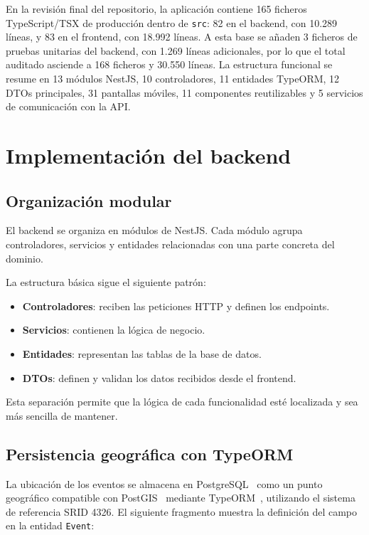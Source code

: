 En la revisión final del repositorio, la aplicación contiene 165 ficheros TypeScript/TSX de producción dentro de \texttt{src}: 82 en el backend, con 10.289 líneas, y 83 en el frontend, con 18.992 líneas. A esta base se añaden 3 ficheros de pruebas unitarias del backend, con 1.269 líneas adicionales, por lo que el total auditado asciende a 168 ficheros y 30.550 líneas. La estructura funcional se resume en 13 módulos NestJS, 10 controladores, 11 entidades TypeORM, 12 DTOs principales, 31 pantallas móviles, 11 componentes reutilizables y 5 servicios de comunicación con la API.

\section{Implementación del backend}

\subsection{Organización modular}

El backend se organiza en módulos de NestJS. Cada módulo agrupa controladores, servicios y entidades relacionadas con una parte concreta del dominio.

La estructura básica sigue el siguiente patrón:

\begin{itemize}
    \item \textbf{Controladores}: reciben las peticiones HTTP y definen los endpoints.
    \item \textbf{Servicios}: contienen la lógica de negocio.
    \item \textbf{Entidades}: representan las tablas de la base de datos.
    \item \textbf{DTOs}: definen y validan los datos recibidos desde el frontend.
\end{itemize}

Esta separación permite que la lógica de cada funcionalidad esté localizada y sea más sencilla de mantener.

\subsection{Persistencia geográfica con TypeORM}

La ubicación de los eventos se almacena en PostgreSQL~\cite{postgresql} como un punto geográfico compatible con PostGIS~\cite{postgisdocs} mediante TypeORM~\cite{typeorm}, utilizando el sistema de referencia SRID 4326. El siguiente fragmento muestra la definición del campo en la entidad \texttt{Event}:

